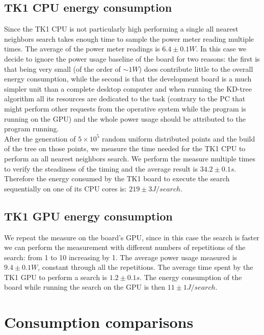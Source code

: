 \subsection{TK1 CPU energy consumption}
Since the TK1 CPU is not particularly high performing a single all nearest neighbors search takes enough time to sample the power meter reading multiple times. The average of the power meter readings is $6.4 \pm 0.1 \unit{W}$. In this case we decide to ignore the power usage baseline of the board for two reasons: the first is that being very small (of the order of $\sim 1 \unit{W}$) does contribute little to the overall energy consumption, while the second is that the development board is a much simpler unit than a complete desktop computer and when running the KD-tree algorithm all its resources are dedicated to the task (contrary to the PC that might perform other requests from the operative system while the program is running on the GPU) and the whole power usage should be attributed to the program running.\\
After the generation of $5 \times 10^5$ random uniform distributed points and the build of the tree on those points, we measure the time needed for the TK1 CPU to perform an all nearest neighbors search. We perform the measure multiple times to verify the steadiness of the timing and the average result is $34.2 \pm 0.1 \unit{s}$. Therefore the energy consumed by the TK1 board to execute the search sequentially on one of its CPU cores is: $219 \pm 3 \unit{J/search}$.

\subsection{TK1 GPU energy consumption}
We repeat the measure on the board's GPU, since in this case the search is faster we can perform the measurement with different numbers of repetitions of the search: from 1 to 10 increasing by 1. The average power usage measured is $9.4 \pm 0.1 \unit{W}$, constant through all the repetitions.
The average time spent by the TK1 GPU to perform a search is $1.2 \pm 0.1 \unit{s}$. The energy consumption of the board while running the search on the GPU is then $11 \pm 1 \unit{J/search}$.

\section{Consumption comparisons}